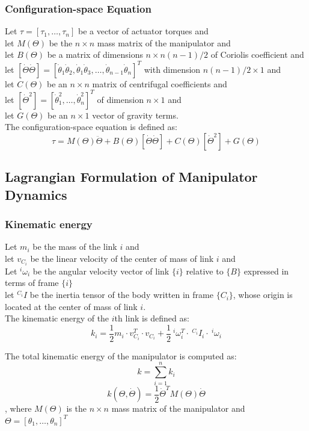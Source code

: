 \documentclass[10pt,a4paper]{article}
\begin{document}
\subsubsection{Configuration-space Equation}
Let $\tau = [\tau_1, \dots, \tau_n]$ be a vector of actuator torques and \\
let $M(\Theta)$ be the $n \times n$ mass matrix of the manipulator and \\
let $B(\Theta)$ be a matrix of dimensions $n \times n(n-1)/2$ of Coriolis coefficient and \\
let $[\dot{\Theta}\dot{\Theta}] = [\dot \theta_1 \dot \theta_2, \dot \theta_1 \dot \theta_3, \dots, \dot \theta_{n-1}\dot \theta_n]^T$ with dimension $n(n-1)/2 \times 1$ and \\
let $C(\Theta)$ be an $n \times n$ matrix of centrifugal coefficients and \\
let $[\dot \Theta^2] = [\dot \theta_1^2, \dots, \dot \theta_n^2]^T$ of dimension $n \times 1$ and \\
let $G(\Theta)$ be an $n \times 1$ vector of gravity terms. \\
The configuration-space equation is defined as: \\
$$
\tau = M(\Theta)\ddot \Theta + B(\Theta)[\dot \Theta \dot \Theta] + C(\Theta)[\dot \Theta^2] + G(\Theta)
$$

\subsection{Lagrangian Formulation of Manipulator Dynamics}
\subsubsection{Kinematic energy}
Let $m_i$ be the mass of the link $i$ and \\
let $v_{C_i}$ be the linear velocity of the center of mass of link $i$ and \\
Let $^i\omega_i$ be the angular velocity vector of link $\{i\}$ relative to $\{B\}$ expressed in terms of frame $\{i\}$ \\
let $^{C_i}I$ be the inertia tensor of the body written in frame $\{C_i\}$, whose origin is located at the center of mass of link $i$. \\
The kinematic energy of the $i$th link is defined as:
$$
k_i = \frac 1 2 m_i ⋅ v_{C_i}^T ⋅ v_{C_i} + \frac 1 2 ~^i\omega_i^T ⋅ ~^{C_i}I_i ⋅ ~^i\omega_i
$$

The total kinematic energy of the manipulator is computed as:
$$
k = \sum_{i = 1}^n k_i
$$
$$
k(\Theta, \dot \Theta) = \frac 1 2 \dot \Theta^T M(\Theta)\dot \Theta
$$
, where $M(\Theta)$ is the $n \times n$ mass matrix of the manipulator and $\Theta = [\theta_1, \dots, \theta_n]^T$
\end{document}
